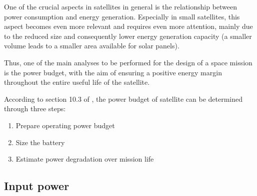 

One of the crucial aspects in satellites in general is the relationship between power consumption and energy generation. Especially in small satellites, this aspect becomes even more relevant and requires even more attention, mainly due to the reduced size and consequently lower energy generation capacity (a smaller volume leads to a smaller area available for solar panels).

Thus, one of the main analyses to be performed for the design of a space mission is the power budget, with the aim of ensuring a positive energy margin throughout the entire useful life of the satellite.

According to section 10.3 of \cite{larson2005}, the power budget of satellite can be determined through three steps:

\begin{enumerate}
    \item Prepare operating power budget
    \item Size the battery
    \item Estimate power degradation over mission life
\end{enumerate}

\subsection{Input power}


